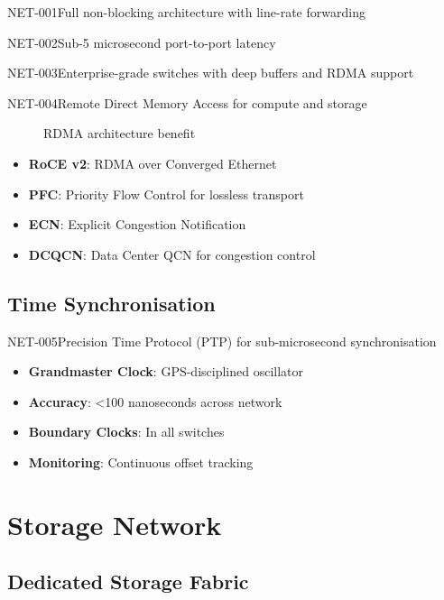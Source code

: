 \begin{requirement}{NET-001}{Full non-blocking architecture with line-rate forwarding}
\begin{requirement}{NET-002}{Sub-5 microsecond port-to-port latency}
\begin{requirement}{NET-003}{Enterprise-grade switches with deep buffers and RDMA support}
\begin{requirement}{NET-004}{Remote Direct Memory Access for compute and storage}
\begin{figure}[H]
\caption{RDMA architecture benefit}
\end{figure}

\begin{itemize}
    \item \textbf{RoCE v2}: RDMA over Converged Ethernet
    \item \textbf{PFC}: Priority Flow Control for lossless transport
    \item \textbf{ECN}: Explicit Congestion Notification
    \item \textbf{DCQCN}: Data Center QCN for congestion control
\end{itemize}

\subsection{Time Synchronisation}

\begin{requirement}{NET-005}{Precision Time Protocol (PTP) for sub-microsecond synchronisation}

\begin{itemize}
    \item \textbf{Grandmaster Clock}: GPS-disciplined oscillator
    \item \textbf{Accuracy}: <100 nanoseconds across network
    \item \textbf{Boundary Clocks}: In all switches
    \item \textbf{Monitoring}: Continuous offset tracking
\end{itemize}

\section{Storage Network}

\subsection{Dedicated Storage Fabric}


\end{requirement}
\end{requirement}
\end{requirement}
\end{requirement}
\end{requirement}
